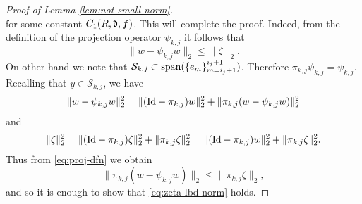 \documentclass{amsart}
\numberwithin{equation}{section}
\def\corAB{}
\begin{document}
\begin{proof}[Proof of Lemma \ref{lem:not-small-norm}]
\begin{equation}
\end{equation}
for some constant $C_1(R,\mathfrak{d}, {\bm f})$. This will complete the proof.
Indeed, from the definition of the projection operator $\psi_{k,j}$ it follows that
\begin{equation}\label{eq:proj-dfn}
\|w- \psi_{k,j} w\|_2 \le \|\zeta\|_2.
\end{equation}
On other hand we note that $\mathcal{S}_{k,j} \subset \operatorname{span}(\{e_m\}_{m=i_j+1}^{i_j+1})$. Therefore $\pi_{k,j} \psi_{k,j} = \psi_{k,j}$. Recalling
that $y \in \mathcal{S}_{k,j}$, we have
\begin{align*}
\|w-\psi_{k,j} w\|_2^2=\|(\corAB{\Id}-\pi_{k,j})w\|_2^2+ \|\pi_{k,j}(w - \psi_{k,j} w)\|_2^2
\end{align*}
and
\begin{align*}
\|\zeta\|_2^2=  \|(\corAB{\Id}-\pi_{k,j}) \zeta\|_2^2 + \|\pi_{k,j} \zeta\|_2^2 = \|(\corAB{\Id}-\pi_{k,j})w\|_2^2 +  \|\pi_{k,j} \zeta\|_2^2.
\end{align*}
Thus from \eqref{eq:proj-dfn} we obtain
\[
\|\pi_{k,j}(w-\psi_{k,j} w)\|_2 \le \|\pi_{k,j} \zeta\|_2,
\]
and so it is enough to show that \eqref{eq:zeta-lbd-norm} holds.


\end{proof}
\end{document}
